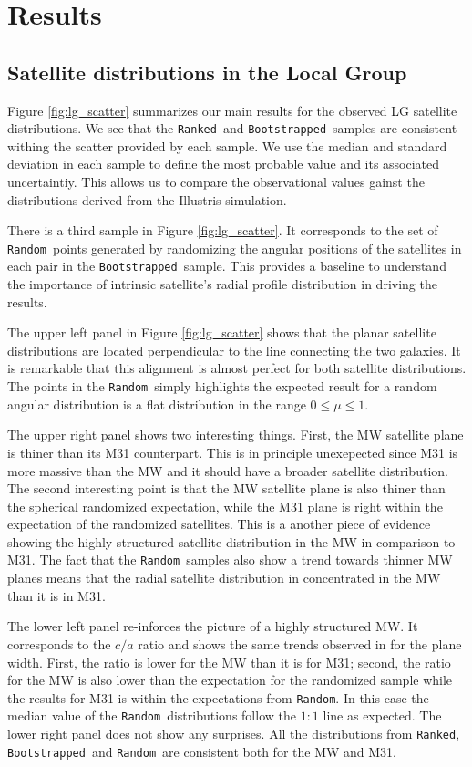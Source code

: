 \documentclass[a4paper,fleqn,usenatbib]{mnras}
\newcommand{\rank}{\texttt{Ranked}}
\newcommand{\boot}{\texttt{Bootstrapped}}
\newcommand{\rand}{\texttt{Random}}
\begin{document}
\section{Results}
\label{sec:results}


\subsection{Satellite distributions in the Local Group}

Figure \ref{fig:lg_scatter} summarizes our main results for the
observed LG satellite distributions.
We see that the \rank\ and \boot\ samples are consistent 
withing the scatter provided by each sample.
We use the median and standard deviation in each sample to define the
most probable value and its associated uncertaintiy.
This allows us to compare the observational values gainst the
distributions derived from the Illustris simulation.

There is a third sample in Figure \ref{fig:lg_scatter}. 
It corresponds to the set of \rand\ points generated
by randomizing the angular positions of the satellites in each pair in
the \boot\ sample. 
This provides a baseline to understand the importance 
of intrinsic satellite's radial profile distribution in driving the
results.   

The upper left panel in Figure \ref{fig:lg_scatter} shows that the
planar satellite distributions are located perpendicular to the line
connecting the two galaxies. 
It is remarkable that this alignment is almost perfect for both
satellite distributions. 
The points in the \rand\ simply highlights the expected result for a
random angular distribution is a flat distribution in the range
$0\leq\mu\leq 1$.

The upper right panel shows two interesting things. 
First, the MW satellite plane is thiner than its M31
counterpart. 
This is in principle unexepected since M31 is more
massive than the MW and it should have a broader satellite
distribution. 
The second interesting point is that the MW satellite plane is also
thiner than the spherical randomized expectation, while the M31 plane
is right within the expectation of the randomized satellites. 
This is a another piece of evidence showing the highly structured
satellite distribution in the MW in comparison to M31. 
The fact that the \rand\ samples also show a trend towards thinner MW
planes means that the radial satellite distribution in concentrated in
the MW than it is in M31.

The lower left panel re-inforces the picture of a highly structured
MW. 
It corresponds to the $c/a$ ratio and shows the same trends observed
in for the plane width. 
First, the ratio is lower for the MW than it is for M31; second, the
ratio for the MW is also lower than the expectation for the randomized
sample while the results for M31 is within the expectations from \rand.  
In this case the median value of the \rand\ distributions follow the
$1:1$ line as expected.
The lower right panel does not show any surprises. 
All the distributions from \rank, \boot\ and \rand\ are consistent
both for the MW and M31. 
\end{document}
